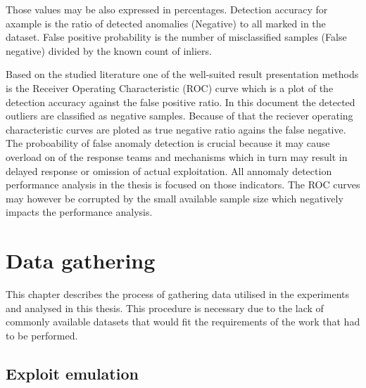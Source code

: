 \documentclass[a4paper,twoside,12pt]{book}
\begin{document}
Those values may be also expressed in percentages. Detection accuracy for axample is the ratio
of detected anomalies (Negative) to all marked in the dataset. False positive probability is 
the number of misclassified samples (False negative) divided by the known count of inliers.  

Based on the studied literature one of the well-suited result presentation methods is the Receiver 
Operating Characteristic (ROC) curve which is a plot of the detection accuracy against the false 
positive ratio. In this document the detected outliers are classified as negative samples. Because 
of that the reciever operating characteristic curves are ploted as true negative ratio agains the 
false negative. The proboability of false anomaly detection is crucial because it may cause overload
on of the response teams and mechanisms which in turn may result in delayed response or omission
of actual exploitation. All annomaly detection performance analysis in the thesis is focused
on those indicators. The ROC curves may however be corrupted by the small available sample size 
which negatively impacts the performance analysis.



\chapter{Data gathering}

This chapter describes the process of gathering data utilised in the experiments and 
analysed in this thesis. This procedure is necessary due to the lack of commonly available 
datasets that would fit the requirements of the work that had to be performed. 

\section{Exploit emulation}
\end{document}
